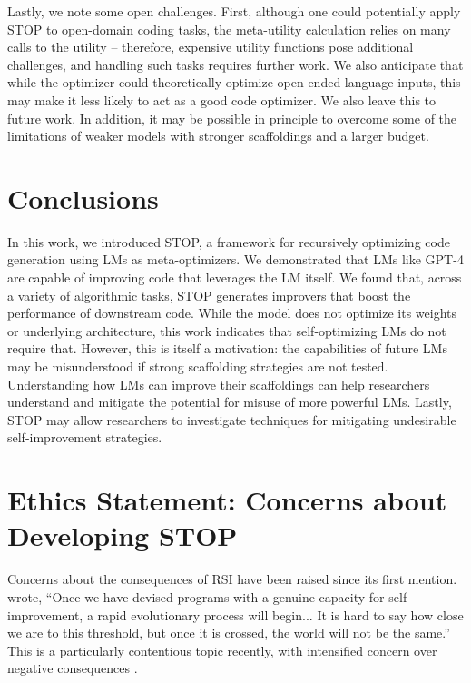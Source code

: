 \documentclass{article} %
\begin{document}
Lastly, we note some open challenges. First, although one could potentially apply STOP to open-domain coding tasks, the meta-utility calculation relies on many calls to the utility -- therefore, expensive utility functions pose additional challenges, and handling such tasks requires further work. We also anticipate that while the optimizer could theoretically optimize open-ended language inputs, this may make it less likely to act as a good code optimizer. We also leave this to future work. In addition, it may be possible in principle to overcome some of the limitations of weaker models with stronger scaffoldings and a larger budget.

%

%
\section{Conclusions}
\vspace{-2px}
In this work, we introduced STOP, a framework for recursively optimizing code generation using LMs as meta-optimizers. We demonstrated that LMs like GPT-4 are capable of improving code that leverages the LM itself. We found that, across a variety of algorithmic tasks, STOP generates improvers that boost the performance of downstream code. 
%
While the model does not optimize its weights or underlying architecture, this work indicates that self-optimizing LMs do not require that.
However, this is itself a motivation: the capabilities of future LMs may be misunderstood if strong scaffolding strategies are not tested.
Understanding how LMs can improve their scaffoldings can help researchers understand and mitigate the potential for misuse of more powerful LMs.
Lastly, STOP may allow researchers to investigate techniques for mitigating undesirable self-improvement strategies.

\section*{Ethics Statement: Concerns about Developing STOP}\label{sec:concerns}
\vspace{-3px}
Concerns about the consequences of RSI have been raised since its first mention. \citet{minsky_marvin_artificial_1966} wrote, ``Once we have devised programs with a genuine capacity for self-improvement, a rapid evolutionary process will begin...
It is hard to say how close we are to this threshold, but once it is crossed, the world will not be the same.'' This is a particularly contentious topic recently, with intensified concern over negative consequences \citep{ambartsoumean2023ai, gabriel_challenge_2021}.
%
\end{document}
